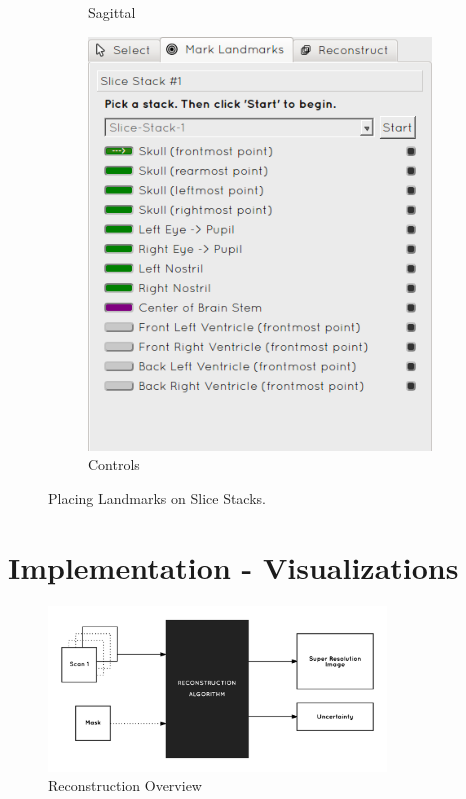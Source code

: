 \begin{figure}[H]
\begin{subfigure}[b]{0.358\textwidth}
    \caption*{Sagittal}
    \label{fig:reconstructionsagittal}
  \end{subfigure}%
  \begin{subfigure}[b]{0.283\textwidth}
    \includegraphics[width=\textwidth]{images/reconstruction/controls.png}
    \caption*{Controls}
    \label{fig:reconstructioncontrols}
  \end{subfigure}
  \caption{Placing Landmarks on Slice Stacks.}\label{fig:reconstructionlandmarks}
\end{figure}

\newpage
\chapter{Implementation - Visualizations}\label{sectiontoolvisualization}

\begin{figure}[h]
  \centering
  \includegraphics[width=0.8\textwidth]{images/reconstruction_overview.png}
  \caption{Reconstruction Overview}
  \label{fig:erosionbefore}
\end{figure}

